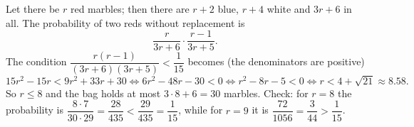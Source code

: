 Let there be $r$ red marbles; then there are $r+2$ blue, $r+4$ white and $3r+6$ in all. The probability of two reds without replacement is
\[
\dfrac{r}{3r+6}\cdot\dfrac{r-1}{3r+5}.
\]
The condition $\dfrac{r(r-1)}{(3r+6)(3r+5)}<\dfrac{1}{15}$ becomes (the denominators are positive)
\[
15r^2-15r<9r^2+33r+30\iff6r^2-48r-30<0\iff r^2-8r-5<0\iff r<4+\sqrt{21}\approx8.58 .
\]
So $r\le8$ and the bag holds at most $3\cdot8+6=\boxed{30}$ marbles. Check: for $r=8$ the probability is $\dfrac{8\cdot7}{30\cdot29}=\dfrac{28}{435}<\dfrac{29}{435}=\dfrac{1}{15}$, while for $r=9$ it is $\dfrac{72}{1056}=\dfrac{3}{44}>\dfrac{1}{15}$.
